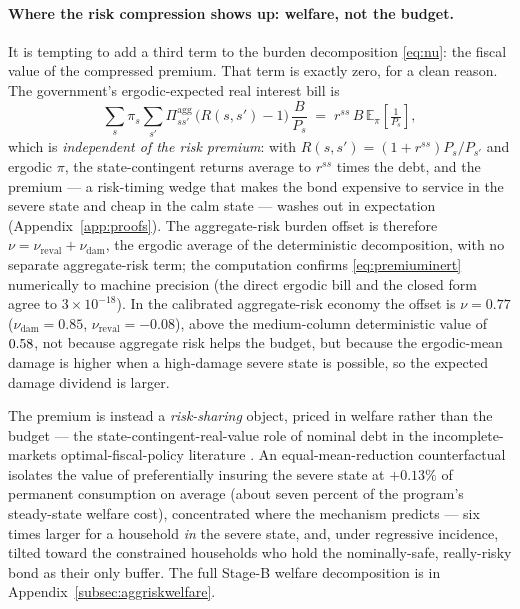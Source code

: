 \documentclass[12pt]{article}
\newcommand{\E}{\mathbb{E}}
\begin{document}
\paragraph{Where the risk compression shows up: welfare, not the budget.}
It is tempting to add a third term to the burden decomposition
\eqref{eq:nu}: the fiscal value of the compressed premium. That term is
exactly zero, for a clean reason. The government's ergodic-expected real interest bill is
\begin{equation}
\sum_s \pi_s \sum_{s'} \Pi^{\mathrm{agg}}_{ss'}\,\big(R(s,s')-1\big)\,\frac{B}{P_s}
\;=\; r^{ss}\,B\,\E_\pi\!\left[\tfrac{1}{P_s}\right],
\label{eq:premiuminert}
\end{equation}
which is \emph{independent of the risk premium}: with
$R(s,s')=(1+r^{ss})P_s/P_{s'}$ and ergodic $\pi$, the state-contingent
returns average to $r^{ss}$ times the debt, and the premium --- a
risk-timing wedge that makes the bond expensive to service in the
severe state and cheap in the calm state --- washes out in expectation
(Appendix~\ref{app:proofs}). The aggregate-risk burden offset is
therefore $\nu=\nu_{\mathrm{reval}}+\nu_{\mathrm{dam}}$, the ergodic average
of the deterministic decomposition, with no separate aggregate-risk term;
the computation confirms \eqref{eq:premiuminert} numerically to machine precision
(the direct ergodic bill and the closed form agree to $3\times10^{-18}$). In
the calibrated aggregate-risk economy the offset is
$\nu=0.77$ ($\nu_{\mathrm{dam}}=0.85$, $\nu_{\mathrm{reval}}=-0.08$),
above the medium-column deterministic value of $0.58$, not because
aggregate risk helps the budget, but because the ergodic-mean damage is
higher when a high-damage severe state is possible, so the expected damage
dividend is larger.

The premium is instead a \emph{risk-sharing} object, priced in welfare rather
than the budget --- the state-contingent-real-value role of nominal debt in the
incomplete-markets optimal-fiscal-policy literature
\citep{begs2017,begs2021}. An equal-mean-reduction counterfactual isolates the
value of preferentially insuring the severe state at $+0.13\%$ of
permanent consumption on average (about seven percent of the program's
steady-state welfare cost), concentrated where the mechanism predicts --- six times larger
for a household \emph{in} the severe state, and, under regressive incidence,
tilted toward the constrained households who hold the nominally-safe,
really-risky bond as their only buffer. The full Stage-B welfare decomposition
is in Appendix~\ref{subsec:aggriskwelfare}.
\end{document}
